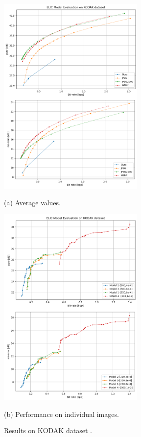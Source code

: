 \documentclass{article}
\begin{document}
\begin{figure}[h!]
\begin{minipage}[b]{0.8\linewidth}
    \centering
    \includegraphics[width=7.2cm]{kodak_fixed.png}
    \centerline{(a) Average values.}\medskip
\end{minipage}
\begin{minipage}[b]{0.8\linewidth}
    
    \centering
    \includegraphics[width=7.2cm]{kodak_per_fixed.png}
    \centerline{(b) Performance on individual images.}\medskip
\end{minipage}
    \label{fig:results}
    \caption{Results on KODAK dataset \cite{kodak}.}
\end{figure}
\end{document}
